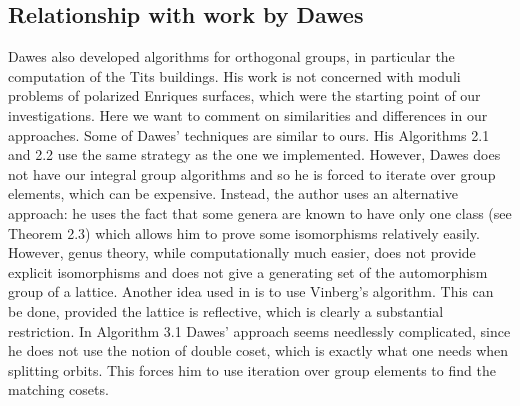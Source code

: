 \documentclass[a4paper,11pt]{article}
\begin{document}
\subsection{Relationship with work by Dawes}\label{seubsec:Dawes}
Dawes \cite{Da} also developed algorithms for orthogonal groups, in particular the computation of the Tits buildings. His work is not concerned with
moduli problems of polarized Enriques surfaces, which were the starting point of our investigations.
Here we want to comment on similarities and differences in our approaches. Some of Dawes' techniques are similar to ours.
His Algorithms 2.1 and 2.2 use the same strategy as the one we implemented. However,
Dawes does not have our integral group algorithms and so he is forced to iterate
over group elements, which can be expensive.
Instead, the author uses an alternative approach: he uses the fact that some genera are known to
have only one class (see Theorem 2.3) which allows him to prove some isomorphisms relatively easily.
However, genus theory, while computationally much easier, does not provide explicit isomorphisms and
does not give a generating set of the automorphism group of a lattice. Another idea used in \cite{Da}
is to use Vinberg's algorithm. This can be done, provided the lattice is reflective, which is clearly
a substantial restriction.
In Algorithm 3.1 Dawes' approach seems needlessly complicated, since he does not use
the notion of double coset, which is exactly what one needs when splitting orbits.
This forces him to use iteration over group elements to find the matching cosets.
\end{document}
